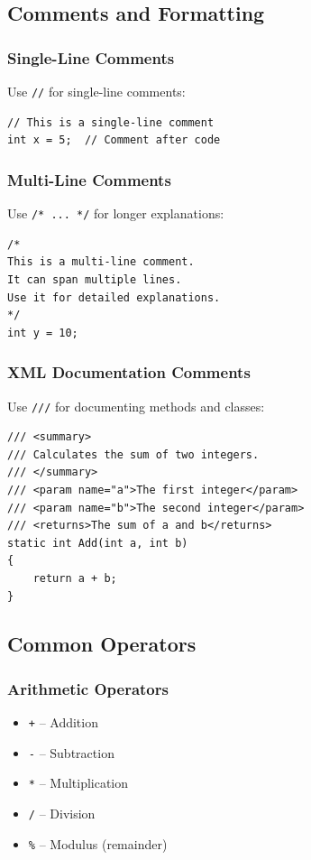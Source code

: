 \documentclass{article}
\begin{document}
\subsection{Comments and Formatting}

\subsubsection{Single-Line Comments}
Use \texttt{//} for single-line comments:
\begin{verbatim}
// This is a single-line comment
int x = 5;  // Comment after code
\end{verbatim}

\subsubsection{Multi-Line Comments}
Use \texttt{/* ... */} for longer explanations:
\begin{verbatim}
/*
This is a multi-line comment.
It can span multiple lines.
Use it for detailed explanations.
*/
int y = 10;
\end{verbatim}

\subsubsection{XML Documentation Comments}
Use \texttt{///} for documenting methods and classes:
\begin{verbatim}
/// <summary>
/// Calculates the sum of two integers.
/// </summary>
/// <param name="a">The first integer</param>
/// <param name="b">The second integer</param>
/// <returns>The sum of a and b</returns>
static int Add(int a, int b)
{
    return a + b;
}
\end{verbatim}

\subsection{Common Operators}

\subsubsection{Arithmetic Operators}
\begin{itemize}
    \item \texttt{+} -- Addition
    \item \texttt{-} -- Subtraction
    \item \texttt{*} -- Multiplication
    \item \texttt{/} -- Division
    \item \texttt{\%} -- Modulus (remainder)
\end{itemize}
\end{document}
